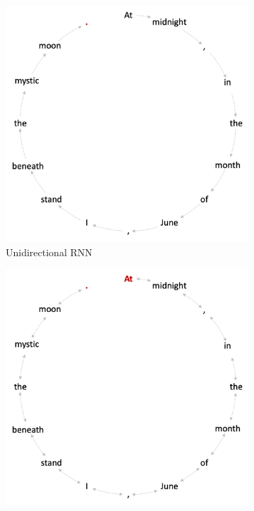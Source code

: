 \begin{figure}[htb!]
    \centering
    \begin{subfigure}[b]{0.475\textwidth}
        \centering
        \includegraphics[width=\columnwidth]{images/rnn_uni.png}
        \caption{Unidirectional RNN}
        \label{subfig:structure-1}
    \end{subfigure}
    \hfill
    \begin{subfigure}[b]{0.475\textwidth}  
        \centering 
        \includegraphics[width=\columnwidth]{images/rnn_bi.png}

\end{subfigure}
\end{figure}
